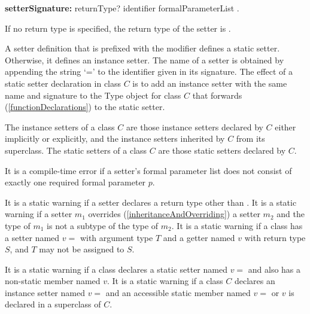 \documentclass{article}
\newcommand{\code}[1]{{\sf #1}}
\begin{document}

\begin{grammar}
{\bf setterSignature:}
       returnType? \SET{} identifier formalParameterList
.
\end{grammar}

\LMHash{}
If no return type is specified, the return type of the setter is  \DYNAMIC{}.

\LMHash{}
A setter definition that is prefixed with the \STATIC{} modifier defines a static setter. Otherwise, it defines an instance setter. The name of a setter is  obtained by appending the  string `='  to the identifier given in its signature. The effect of a static setter declaration in class $C$ is to add an instance setter with the same name and signature to the \code{Type} object for class $C$ that forwards (\ref{functionDeclarations})  to the static setter.


\LMHash{}
The instance setters of a class $C$ are those instance setters declared by $C$ either implicitly or explicitly, and the instance setters inherited by $C$ from its superclass. The static setters of a class $C$ are those static setters declared by $C$.

\LMHash{}
It is a compile-time error if a setter's formal parameter list does not consist of exactly one required formal parameter $p$.  


\LMHash{}
It is a static warning if a setter declares a return type other than \VOID{}.
It is a static warning if a setter $m_1$ overrides  (\ref{inheritanceAndOverriding}) a setter $m_2$ and the type of $m_1$ is not a subtype of the type of $m_2$. It is a static warning if a class has a setter named $v=$ with argument type $T$ and a getter named $v$ with return type $S$, and $T$ may not be assigned to $S$. 

\LMHash{}
It is a static warning if a class  declares a static setter named $v=$ and also has a non-static member named $v$. It is a static warning if a class $C$ declares an instance setter named $v=$ and an accessible static member named $v=$ or $v$ is declared in a superclass of $C$.
\end{document}
